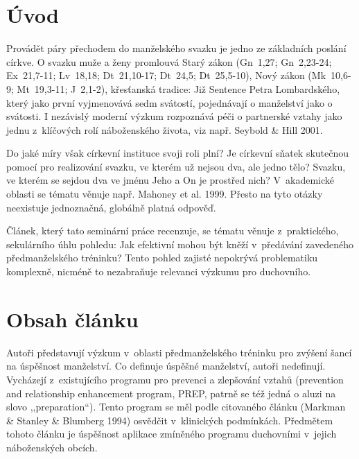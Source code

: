 \chapter{Úvod}
\label{kap:uvod}

Provádět páry přechodem do manželského svazku je jedno ze základních poslání
církve. O svazku muže a ženy promlouvá Starý zákon (Gn~1,27; Gn~2,23-24;
Ex~21,7-11; Lv~18,18; Dt~21,10-17; Dt~24,5; Dt~25,5-10), Nový zákon (Mk~10,6-9;
Mt~19,3-11; J~2,1-2), křesťanská tradice: Již Sentence Petra Lombardského, který
jako první vyjmenovává sedm svátostí, pojednávají o manželství jako o svátosti.
I nezávislý moderní výzkum rozpoznává péči o partnerské vztahy jako jednu
z~klíčových rolí náboženského života, viz např. Seybold \& Hill
2001\cite{seybold2001role}.

Do jaké míry však církevní instituce svoji roli plní? Je církevní sňatek
skutečnou pomocí pro realizování svazku, ve kterém už nejsou dva, ale jedno
tělo? Svazku, ve kterém se sejdou dva ve jménu Jeho a On je prostřed nich?
V~akademické oblasti se tématu věnuje např. Mahoney et al.
1999\cite{mahoney1999marriage}.  Přesto na tyto otázky neexistuje jednoznačná,
globálně platná odpověď. 

Článek, který tato seminární práce recenzuje, se tématu věnuje z~praktického,
sekulárního úhlu pohledu: Jak efektivní mohou být kněží v~předávání zavedeného
předmanželského tréninku? Tento pohled zajisté nepokrývá problematiku komplexně,
nicméně to nezabraňuje relevanci výzkumu pro duchovního.

\vspace{15mm}
\chapter{Obsah článku}

Autoři představují výzkum v~oblasti předmanželského tréninku pro zvýšení šancí
na úspěšnost manželství\cite{stanley2001community}. Co definuje úspěšné
manželství, autoři nedefinují.  Vycházejí z~existujícího programu pro prevenci a
zlepšování vztahů (prevention and relationship enhancement program, PREP, patrně
se též jedná o aluzi na slovo ,,preparation``). Tento program se měl podle
citovaného článku (Markman \& Stanley \& Blumberg
1994\cite{markman1994fighting}) osvědčit v~klinických podmínkách.  Předmětem
tohoto článku je úspěšnost aplikace zmíněného programu duchovními v~jejich
náboženských obcích.

